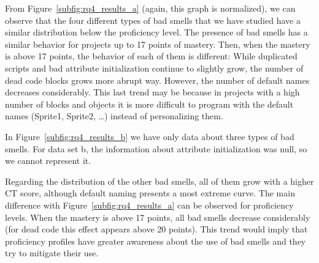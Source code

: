 From Figure~\ref{subfig:rq4_results_a} (again, this graph is normalized), we can observe that the four different types of bad smells that we have studied have a similar distribution below the proficiency level. The presence of bad smells has a similar behavior for projects up to 17 points of mastery. Then, when the mastery is above 17 points, the behavior of each of them is different: While duplicated scripts and bad attribute initialization continue to slightly grow, the number of dead code blocks grows more abrupt way. However, the number of default names decreases considerably. This last trend may be because in projects with a high number of blocks and objects it is more difficult to program with the default names (Sprite1, Sprite2, \ldots) instead of personalizing them. 

In Figure~\ref{subfig:rq4_results_b} we have only data about three types of bad smells. For data set b, the information about attribute initialization was null, so we cannot represent it. 

Regarding the distribution of the other bad smells, all of them grow with a higher CT score, although default naming presents a most extreme curve. The main difference with Figure~\ref{subfig:rq4_results_a} can be observed for proficiency levels. When the mastery is above 17 points, all bad smells decrease considerably (for dead code this effect appears above 20 points). This trend would imply that proficiency profiles have greater awareness about the use of bad smells and they try to mitigate their use. 


